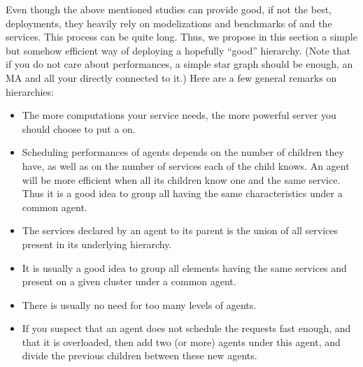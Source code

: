 Even though the above mentioned studies can provide good, if not the best,
deployments, they heavily rely on modelizations and benchmarks of \diet and the
services. This process can be quite long. Thus, we propose in this section a
simple but somehow efficient way of deploying a hopefully ``good'' hierarchy.
(Note that if you do not care about performances, a simple star
graph should be enough, \ie an MA and all your \seds directly connected to it.)
Here are a few general remarks on \diet hierarchies:
\begin{itemize}
\item The more computations your service needs, the more powerful server you
  should choose to put a \sed on.
\item Scheduling performances of agents depends on the number of children they
  have, as well as on the number of services each of the child knows. An agent
  will be more efficient when all its children know one and the same
  service. Thus it is a good idea to group all \seds having the same
  characteristics under a common agent.
\item The services declared by an agent to its parent is the union of all
  services present in its underlying hierarchy.
\item It is usually a good idea to group all \diet elements having the same
  services and present on a given cluster under a common agent.
\item There is usually no need for too many levels of agents.
\item If you suspect that an agent does not schedule the requests fast enough,
  and that it is overloaded, then add two (or more) agents under this agent,
  and divide the previous children between these new agents.
\end{itemize}


